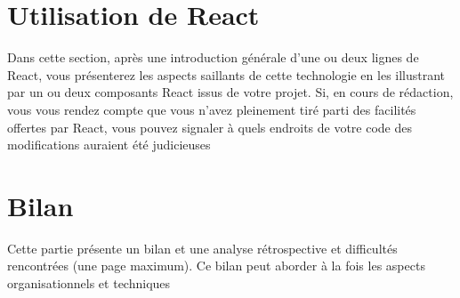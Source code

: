 \documentclass[a4paper]{article}
\begin{document}
\section{Utilisation de React}

Dans cette section, après une  introduction générale d’une ou deux lignes de React, vous présenterez les aspects saillants de cette technologie en les illustrant par un ou deux composants React issus de votre projet. Si, en cours de rédaction, vous vous rendez compte que vous n’avez pleinement tiré parti des facilités offertes par React, vous pouvez signaler à quels endroits de votre code des 
modifications auraient été judicieuses

\section{Bilan}

Cette partie présente un bilan et une analyse rétrospective et difficultés rencontrées 
(une page maximum). Ce bilan peut aborder à la fois les aspects organisationnels et 
techniques

    
\end{document}
